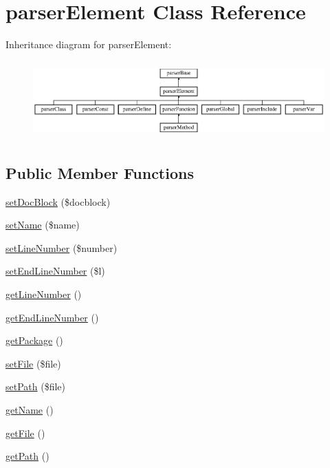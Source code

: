 \hypertarget{classparser_element}{\section{parser\-Element \-Class \-Reference}
\label{classparser_element}
}
\-Inheritance diagram for parser\-Element\-:\begin{figure}[H]
\begin{center}
\leavevmode
\includegraphics[height=3.018868cm]{classparser_element}
\end{center}
\end{figure}
\subsection*{\-Public \-Member \-Functions}
\begin{DoxyCompactItemize}
\item 
\hyperlink{classparser_element_ae07f67f609ef4af5bbe3ffae8ebefad7}{set\-Doc\-Block} (\$docblock)
\item 
\hyperlink{classparser_element_a2fe666694997d047711d7653eca2f132}{set\-Name} (\$name)
\item 
\hyperlink{classparser_element_ae510a35d05668f49bb363f3589c3659a}{set\-Line\-Number} (\$number)
\item 
\hyperlink{classparser_element_a5ad99f75fc8bc023acd6c2ae33672a31}{set\-End\-Line\-Number} (\$l)
\item 
\hyperlink{classparser_element_ac145ff339a8c5cb3df6b29f76bd1168e}{get\-Line\-Number} ()
\item 
\hyperlink{classparser_element_aed9e01150ce8c19289329f5cd51c7d18}{get\-End\-Line\-Number} ()
\item 
\hyperlink{classparser_element_a003e9642678de5840fb9049636a03829}{get\-Package} ()
\item 
\hyperlink{classparser_element_a786ea2bbab26bd4a0ecae24b253d17fe}{set\-File} (\$file)
\item 
\hyperlink{classparser_element_a6d749e5e454e43f174efbbd9648e5113}{set\-Path} (\$file)
\item 
\hyperlink{classparser_element_a3d0963e68bb313b163a73f2803c64600}{get\-Name} ()
\item 
\hyperlink{classparser_element_adf61e733be7f62a3f4bedbe7d2e02ec2}{get\-File} ()
\item 
\hyperlink{classparser_element_a30c5c67b2bf8e2e2ccc7e361faa20afe}{get\-Path} ()
\end{DoxyCompactItemize}
